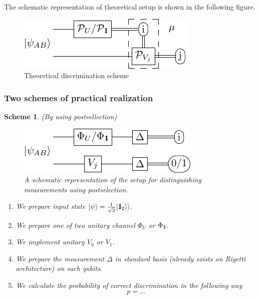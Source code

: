\documentclass[preprint,12pt, a4paper]{elsarticle}
\newcommand{\ket}[1]{\ensuremath{|#1\rangle}}
\newcommand{\1}{{\rm 1\hspace{-0.9mm}l}}
\newcommand{\Id}{{\rm 1\hspace{-0.9mm}l}}
\newtheorem{scheme}{Scheme}
\begin{document}
The schematic representation of theoretical setup is shown in the following 
figure. 

\begin{figure}[h!]
	\centering
	\includegraphics[scale=1.2]{pics/theoretical_scheme}
	\caption{Theoretical discrimination scheme}
	\label{fig:theoretical_scheme}
\end{figure}





\subsubsection{Two schemes of practical realization}

\begin{scheme}(By using postsellection)
	
	\begin{figure}[h!]
		\centering 
		\includegraphics[scale=1.2]{pics/postselection} 
		
		\caption{ A schematic representation of the setup for distinguishing
			measurements using postselection. 
		}\label{fig:postsellection}
	\end{figure}
	\begin{enumerate}
		\item We prepare input state $\ket{\psi} = \frac{1}{\sqrt{2} } | \Id_2 \rangle 
		\rangle. $
		\item We prepare one of two unitary channel $\Phi_{U} $ or $\Phi_{\1}$. 
		\item We implement unitary $V_0 $ or $ V_1$.
		\item We prepare the measurement $\Delta$ in standard basis (already exists on 
		Rigetti architecture) on each qubits.
		\item We calculate the probability of correct discrimination in the following 
		way
		\begin{equation}
		p = ...
		\end{equation}
	\end{enumerate}
\end{scheme}
\end{document}
